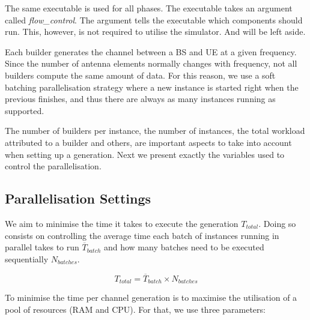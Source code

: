 The same executable is used for all phases. The executable takes an argument called \textit{flow\_control}. The argument tells the executable which components should run. This, however, is not required to utilise the simulator. And will be left aside.

Each builder generates the channel between a BS and UE at a given frequency. Since the number of antenna elements normally changes with frequency, not all builders compute the same amount of data. For this reason, we use a soft batching parallelisation strategy where a new instance is started right when the previous finishes, and thus there are always as many instances running as supported.

The number of builders per instance, the number of instances, the total workload attributed to a builder and others, are important aspects to take into account when setting up a generation. Next we present exactly the variables used to control the parallelisation.


\subsection{Parallelisation Settings}


We aim to minimise the time it takes to execute the generation $T_{total}$. Doing so consists on controlling the average time each batch of instances running in parallel takes to run $\overline{T}_{batch}$ and how many batches need to be executed sequentially $N_{batches}$.

\begin{equation}
    T_{total} = \overline{T}_{batch} \times N_{batches}
\end{equation}


To minimise the time per channel generation is to maximise the utilisation of a pool of resources (RAM and CPU). For that, we use three parameters:

